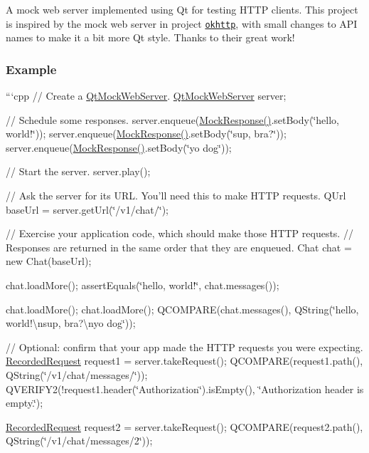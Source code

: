 A mock web server implemented using Qt for testing H\+T\+T\+P clients. This project is inspired by the mock web server in project \href{https://github.com/square/okhttp/tree/master/mockwebserver}{\tt okhttp}, with small changes to A\+P\+I names to make it a bit more Qt style. Thanks to their great work!

\subsubsection*{Example}

```cpp // Create a \hyperlink{class_qt_mock_web_server}{Qt\+Mock\+Web\+Server}. \hyperlink{class_qt_mock_web_server}{Qt\+Mock\+Web\+Server} server;

// Schedule some responses. server.\+enqueue(\hyperlink{class_mock_response}{Mock\+Response()}.set\+Body(\char`\"{}hello, world!\char`\"{})); server.\+enqueue(\hyperlink{class_mock_response}{Mock\+Response()}.set\+Body(\char`\"{}sup, bra?\char`\"{})); server.\+enqueue(\hyperlink{class_mock_response}{Mock\+Response()}.set\+Body(\char`\"{}yo dog\char`\"{}));

// Start the server. server.\+play();

// Ask the server for its U\+R\+L. You'll need this to make H\+T\+T\+P requests. Q\+Url base\+Url = server.\+get\+Url(\char`\"{}/v1/chat/\char`\"{});

// Exercise your application code, which should make those H\+T\+T\+P requests. // Responses are returned in the same order that they are enqueued. Chat chat = new Chat(base\+Url);

chat.\+load\+More(); assert\+Equals(\char`\"{}hello, world!\char`\"{}, chat.\+messages());

chat.\+load\+More(); chat.\+load\+More(); Q\+C\+O\+M\+P\+A\+R\+E(chat.\+messages(), Q\+String(\char`\"{}hello, world!\textbackslash{}nsup, bra?\textbackslash{}nyo dog\char`\"{}));

// Optional\+: confirm that your app made the H\+T\+T\+P requests you were expecting. \hyperlink{class_recorded_request}{Recorded\+Request} request1 = server.\+take\+Request(); Q\+C\+O\+M\+P\+A\+R\+E(request1.\+path(), Q\+String(\char`\"{}/v1/chat/messages/\char`\"{})); Q\+V\+E\+R\+I\+F\+Y2(!request1.header(\char`\"{}\+Authorization\char`\"{}).is\+Empty(), \char`\"{}\+Authorization header is empty.\char`\"{});

\hyperlink{class_recorded_request}{Recorded\+Request} request2 = server.\+take\+Request(); Q\+C\+O\+M\+P\+A\+R\+E(request2.\+path(), Q\+String(\char`\"{}/v1/chat/messages/2\char`\"{}));

